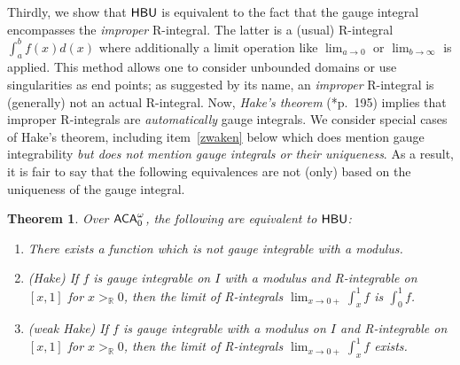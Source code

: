 \documentclass[reqno]{amsart}
\newtheorem{thm}{Theorem}
\def\({\textup{(}}
\def\){\textup{)}}
\def\R{{\mathbb  R}}
\def\di{\rightarrow}
\def\ACA{\textup{\textsf{ACA}}}
\def\HBU{\textup{\textsf{HBU}}}
\numberwithin{equation}{section}
\numberwithin{thm}{section}
\begin{document}
Thirdly, we show that $\HBU$ is equivalent to the fact that the gauge integral encompasses the \emph{improper} R-integral.  
The latter is a (usual) R-integral $\int_{a}^{b}f(x)d(x)$ where additionally a limit operation like $\lim_{a\di 0}$ or $\lim_{b\di \infty}$ is applied.  
This method allows one to consider unbounded domains or use singularities as end points; as suggested by its name, an \emph{improper} R-integral 
is (generally) not an actual R-integral.  
Now, \emph{Hake's theorem} (\cite{bartle}*{p.\ 195}) implies that improper R-integrals are \emph{automatically} gauge integrals.  
We consider special cases of Hake's theorem, including item~\eqref{zwaken} below which does mention gauge integrability \emph{but does not mention gauge integrals or their uniqueness}. As a result, it is fair to say that the following 
equivalences are not (only) based on the uniqueness of the gauge integral.    
\begin{thm}\label{coromag} Over $\ACA_{0}^{\omega}$, the following are equivalent to $\HBU$:
\begin{enumerate}
\renewcommand{\theenumi}{\roman{enumi}}
\item There exists a function which is not gauge integrable with a modulus.\label{itemwon}
\item \(Hake\) If $f$ is gauge integrable on $I$ with a modulus and R-integrable on $[x,1]$ for $x>_{\R}0$, then the limit of R-integrals $\lim_{x\di 0+}\int_{x}^{1}f$ is $\int_{0}^{1}f$.\label{haken}
\item \(weak Hake\) If $f$ is gauge integrable with a modulus on $I$ and R-integrable on $[x,1]$ for $x>_{\R}0$, then the limit of R-integrals $\lim_{x\di 0+}\int_{x}^{1}f $ exists.\label{zwaken}
\end{enumerate}
\end{thm}
\end{document}
